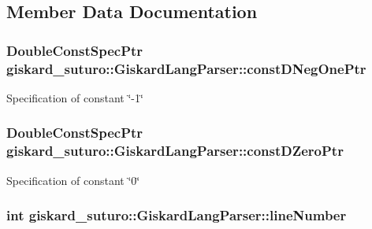 \subsection{Member Data Documentation}
\hypertarget{classgiskard__suturo_1_1GiskardLangParser_af82a7613902dec8003b2f95e3607e203}{
\subsubsection[{const\-D\-Neg\-One\-Ptr}]{\setlength{\rightskip}{0pt plus 5cm}Double\-Const\-Spec\-Ptr giskard\-\_\-suturo\-::\-Giskard\-Lang\-Parser\-::const\-D\-Neg\-One\-Ptr\hspace{0.3cm}{\ttfamily [private]}}}\label{classgiskard__suturo_1_1GiskardLangParser_af82a7613902dec8003b2f95e3607e203}
Specification of constant \char`\"{}-\/1\char`\"{} \hypertarget{classgiskard__suturo_1_1GiskardLangParser_a2cbca21a0af921f28ec5af80b8f233ea}{
\subsubsection[{const\-D\-Zero\-Ptr}]{\setlength{\rightskip}{0pt plus 5cm}Double\-Const\-Spec\-Ptr giskard\-\_\-suturo\-::\-Giskard\-Lang\-Parser\-::const\-D\-Zero\-Ptr\hspace{0.3cm}{\ttfamily [private]}}}\label{classgiskard__suturo_1_1GiskardLangParser_a2cbca21a0af921f28ec5af80b8f233ea}
Specification of constant \char`\"{}0\char`\"{} \hypertarget{classgiskard__suturo_1_1GiskardLangParser_a80c8068fe1360e40e27677709768fe1c}{
\subsubsection[{line\-Number}]{\setlength{\rightskip}{0pt plus 5cm}int giskard\-\_\-suturo\-::\-Giskard\-Lang\-Parser\-::line\-Number\hspace{0.3cm}{\ttfamily [private]}}}\label{classgiskard__suturo_1_1GiskardLangParser_a80c8068fe1360e40e27677709768fe1c}
